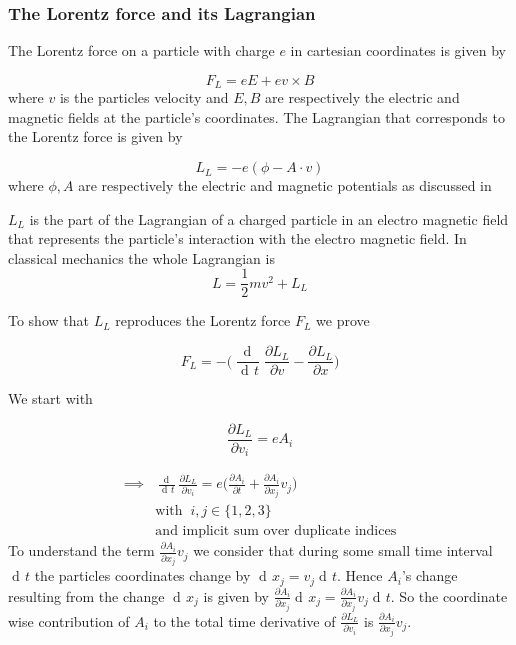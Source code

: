 \documentclass{article}
\DeclareMathOperator{\dd}{d\!}
\begin{document}
\subsubsection{The Lorentz force and its Lagrangian} \label{sectionLorentzForceLagrangian}

The Lorentz force on a particle with charge $e$ in cartesian coordinates is given by

\begin{equation} \label{lorentzForceLaw}
    F_L = e E + e v \times B
\end{equation}
where $v$ is the particles velocity and $E,B$ are respectively the electric and magnetic fields at the particle's coordinates.
The Lagrangian that corresponds to the Lorentz force is given by

\begin{equation} \label{lorentzForceLagrangian}
    L_L = - e (\phi - A \cdot v)
\end{equation}
where $\phi, A$ are respectively the electric and magnetic potentials as discussed in \cite{LagrangeOfField}

$L_L$ is the part of the Lagrangian of a charged particle in an electro magnetic field that represents the particle's interaction with the electro magnetic field.
In classical mechanics the whole Lagrangian is
\begin{equation}
    L = \frac{1}{2}mv^2 + L_L
\end{equation}

To show that $L_L$ reproduces the Lorentz force $F_L$ we prove

\begin{equation}
    F_L = -\bigg(\frac{\dd}{\dd t} \frac{\partial L_L}{\partial v} - \frac{\partial L_L}{\partial x} \bigg)
\end{equation}

We start with

\begin{equation}
    \frac{\partial L_L}{\partial v_i} = e A_i
\end{equation}

\begin{align}
    \implies & \frac{\dd}{\dd t} \frac{\partial L_L}{\partial v_i} = e \bigg(\frac{\partial A_i}{\partial t} + \frac{\partial A_i}{\partial x_j} v_j\bigg) \\
    & \text{with} \;\; i,j \in \{1,2,3\} \\
    & \text{and implicit sum over duplicate indices} \nonumber
\end{align}
To understand the term $\frac{\partial A_i}{\partial x_j} v_j$ we consider that during some small time interval $\dd t$ the particles coordinates change by $\dd x_j = v_j \dd t$.
Hence $A_i$'s change resulting from the change $\dd x_j$ is given by $\frac{\partial A_i}{\partial x_j} \dd x_j = \frac{\partial A_i}{\partial x_j} v_j \dd t$.
So the coordinate wise contribution of $A_i$ to the total time derivative of $\frac{\partial L_L}{\partial v_i}$ is $\frac{\partial A_i}{\partial x_j} v_j$.
\end{document}
